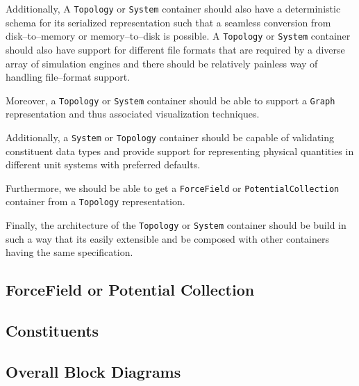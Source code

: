 \documentclass[12pt]{article}
\begin{document}
Additionally, A \texttt{Topology} or \texttt{System} container should also have a deterministic schema for its serialized representation such that a seamless conversion from disk--to--memory or memory--to--disk is possible. A \texttt{Topology} or \texttt{System} container should also have support for different file formats that are required by a diverse array of simulation engines and there should be relatively painless way of handling file--format support.

Moreover, a \texttt{Topology} or \texttt{System} container should be able to support a \texttt{Graph} representation and thus associated visualization techniques.

Additionally, a \texttt{System} or \texttt{Topology} container should be capable of validating constituent data types and provide support for representing physical quantities in different unit systems with preferred defaults.

Furthermore, we should be able to get a \texttt{ForceField} or \texttt{PotentialCollection} container from a \texttt{Topology} representation.

Finally, the architecture of the \texttt{Topology} or \texttt{System} container should be build in such a way that its easily extensible and be composed with other containers having the same specification.

\subsection{ForceField or Potential Collection}
\label{def:ForceField}

\subsection{Constituents}
\subsection{Overall Block Diagrams}
\end{document}
